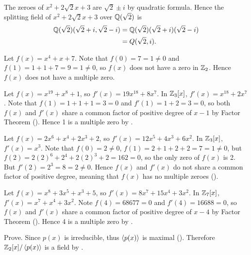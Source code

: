 \begin{questions}
\begin{partquestions}{\alph*}
        \item The zeroes of $x^2 + 2\sqrt2x + 3$ are $\sqrt2 \pm i$ by quadratic formula. Hence the splitting field of $x^2 + 2\sqrt2x + 3$ over $\mathbb{Q}(\sqrt2)$ is
        \begin{align*}
            \mathbb{Q}(\sqrt2)(\sqrt2+i, \sqrt2-i) &= \mathbb{Q}(\sqrt2)(\sqrt2 + i)(\sqrt2 - i)\\
            &= Q(\sqrt2, i).
        \end{align*}
    \end{partquestions}

    \item \begin{partquestions}{\alph*}
        \item Let $f(x) = x^4 + x + 7$. Note that $f(0) = 7 = 1 \neq 0$ and $f(1) = 1 + 1 + 7 = 9 = 1 \neq 0$, so $f(x)$ does not have a zero in $\mathbb{Z}_2$. Hence $f(x)$ does not have a multiple zero.

        \item Let $f(x) = x^{19} + x^8 + 1$, so $f'(x) = 19x^{18} + 8x^7$. In $\mathbb{Z}_3[x]$, $f'(x) = x^{18} + 2x^7$. Note that $f(1) = 1 + 1 + 1 = 3 = 0$ and $f'(1) = 1 + 2 = 3 = 0$, so both $f(x)$ and $f'(x)$ share a common factor of positive degree of $x-1$ by Factor Theorem (). Hence 1 is a multiple zero by .

        \item Let $f(x) = 2x^6 + x^4 + 2x^3 + 2$, so $f'(x) = 12x^5 + 4x^3 + 6x^2$. In $\mathbb{Z}_3[x]$, $f'(x) = x^3$. Note that $f(0) = 2 \neq 0$, $f(1) = 2 + 1 + 2 + 2 = 7 = 1 \neq 0$, but $f(2) = 2(2)^6 + 2^4 + 2(2)^3 + 2 = 162 = 0$, so the only zero of $f(x)$ is 2. But $f'(2) = 2^3 = 8 = 2 \neq 0$. Hence $f(x)$ and $f'(x)$ do not share a common factor of positive degree, meaning that $f(x)$ has no multiple zeroes ().

        \item Let $f(x) = x^8 + 3x^5 + x^3 + 5$, so $f'(x) = 8x^7 + 15x^4 + 3x^2$. In $\mathbb{Z}_7[x]$, $f'(x) = x^7 + x^4 + 3x^2$. Note $f(4) = 68677 = 0$ and $f'(4) = 16688 = 0$, so $f(x)$ and $f'(x)$ share a common factor of positive degree of $x-4$ by Factor Theorem (). Hence 4 is a multiple zero by .
    \end{partquestions}

    \item \begin{partquestions}{\roman*}
        \item Prove. Since $p(x)$ is irreducible, thus $\left\langle p(x)\right\rangle$ is maximal (). Therefore $\mathbb{Z}_2[x]/\left\langle p(x)\right\rangle$ is a field by .


\end{partquestions}
\end{questions}
